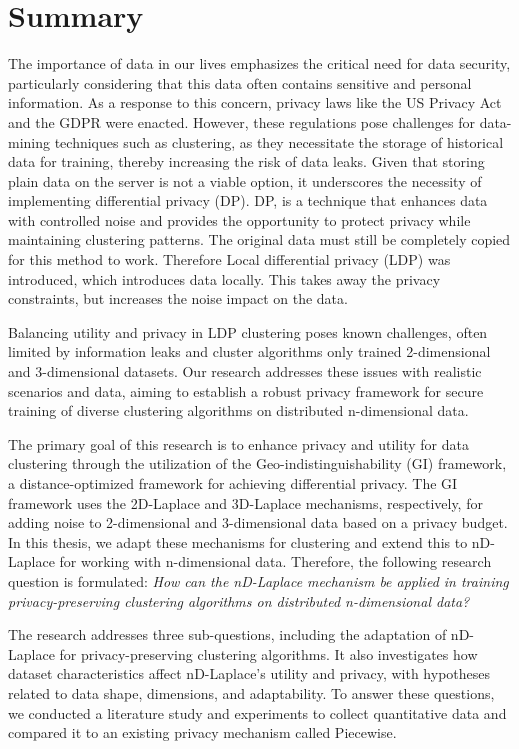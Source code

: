 \chapter{Summary}
The importance of data in our lives emphasizes the critical need for data security, particularly considering that this data often contains sensitive and personal information. As a response to this concern, privacy laws like the US Privacy Act and the GDPR were enacted. However, these regulations pose challenges for data-mining techniques such as clustering, as they necessitate the storage of historical data for training, thereby increasing the risk of data leaks. Given that storing plain data on the server is not a viable option, it underscores the necessity of implementing differential privacy (DP).
DP, is a technique that enhances data with controlled noise and provides the opportunity to protect privacy while maintaining clustering patterns.
The original data must still be completely copied for this method to work.
Therefore Local differential privacy (LDP) was introduced, which introduces data locally.
This takes away the privacy constraints, but increases the noise impact on the data.

Balancing utility and privacy in LDP clustering poses known challenges, often limited by information leaks and cluster algorithms only trained 2-dimensional and 3-dimensional datasets. Our research addresses these issues with realistic scenarios and data, aiming to establish a robust privacy framework for secure training of diverse clustering algorithms on distributed n-dimensional data. \newline

The primary goal of this research is to enhance privacy and utility for data clustering through the utilization of the Geo-indistinguishability (GI) framework, a distance-optimized framework for achieving differential privacy. 
The GI framework uses the 2D-Laplace and 3D-Laplace mechanisms, respectively, for adding noise to 2-dimensional and 3-dimensional data based on a privacy budget. 
In this thesis, we adapt these mechanisms for clustering and extend this to nD-Laplace for working with n-dimensional data. 
Therefore, the following research question is formulated: \newline
\textit{How can the nD-Laplace mechanism be applied in training privacy-preserving clustering algorithms on distributed n-dimensional data?}

The research addresses three sub-questions, including the adaptation of nD-Laplace for privacy-preserving clustering algorithms. 
It also investigates how dataset characteristics affect nD-Laplace's utility and privacy, with hypotheses related to data shape, dimensions, and adaptability. 
To answer these questions, we conducted a literature study and experiments to collect quantitative data and compared it to an existing privacy mechanism called Piecewise. \newline

